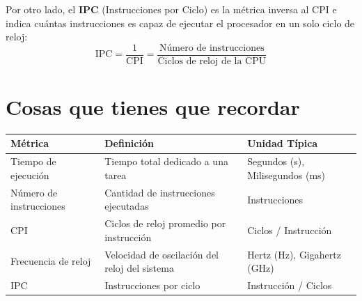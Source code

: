 \documentclass[12pt, a4paper]{article}
\begin{document}
	
	Por otro lado, el \textbf{IPC} (Instrucciones por Ciclo) es la métrica inversa al CPI e indica cuántas instrucciones es capaz de ejecutar el procesador en un solo ciclo de reloj:
	\begin{equation}
		\text{IPC} = \frac{1}{\text{CPI}} = \frac{\text{Número de instrucciones}}{\text{Ciclos de reloj de la CPU}}
	\end{equation}
	
	\clearpage
	
	\section{Cosas que tienes que recordar}
	
	\begin{table}[h!]
		\centering
		
		\begin{tabular}{l | p{7cm} | p{4.5cm}}
			\toprule
			\textbf{Métrica} & \textbf{Definición} & \textbf{Unidad Típica} \\
			\midrule
			Tiempo de ejecución & Tiempo total dedicado a una tarea & Segundos (s), Milisegundos (ms) \\
			\midrule
			Número de instrucciones & Cantidad de instrucciones ejecutadas & Instrucciones \\
			\midrule
			CPI & Ciclos de reloj promedio por instrucción & Ciclos / Instrucción \\
			\midrule
			Frecuencia de reloj & Velocidad de oscilación del reloj del sistema & Hertz (Hz), Gigahertz (GHz) \\
			\midrule
			IPC & Instrucciones por ciclo & Instrucción / Ciclos \\
			\bottomrule
		\end{tabular}
	\end{table}
	
\end{document}
